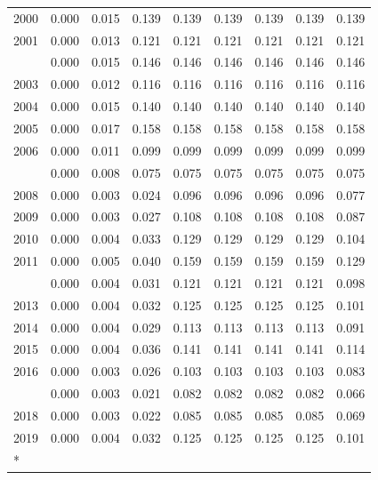 \documentclass[
]{article}
\begin{document}
\begin{longtable}[t]{lrrrrrrrr}
2000 & 0.000 & 0.015 & 0.139 & 0.139 & 0.139 & 0.139 & 0.139 & 0.139\\
2001 & 0.000 & 0.013 & 0.121 & 0.121 & 0.121 & 0.121 & 0.121 & 0.121\\
\addlinespace
2002 & 0.000 & 0.015 & 0.146 & 0.146 & 0.146 & 0.146 & 0.146 & 0.146\\
2003 & 0.000 & 0.012 & 0.116 & 0.116 & 0.116 & 0.116 & 0.116 & 0.116\\
2004 & 0.000 & 0.015 & 0.140 & 0.140 & 0.140 & 0.140 & 0.140 & 0.140\\
2005 & 0.000 & 0.017 & 0.158 & 0.158 & 0.158 & 0.158 & 0.158 & 0.158\\
2006 & 0.000 & 0.011 & 0.099 & 0.099 & 0.099 & 0.099 & 0.099 & 0.099\\
\addlinespace
2007 & 0.000 & 0.008 & 0.075 & 0.075 & 0.075 & 0.075 & 0.075 & 0.075\\
2008 & 0.000 & 0.003 & 0.024 & 0.096 & 0.096 & 0.096 & 0.096 & 0.077\\
2009 & 0.000 & 0.003 & 0.027 & 0.108 & 0.108 & 0.108 & 0.108 & 0.087\\
2010 & 0.000 & 0.004 & 0.033 & 0.129 & 0.129 & 0.129 & 0.129 & 0.104\\
2011 & 0.000 & 0.005 & 0.040 & 0.159 & 0.159 & 0.159 & 0.159 & 0.129\\
\addlinespace
2012 & 0.000 & 0.004 & 0.031 & 0.121 & 0.121 & 0.121 & 0.121 & 0.098\\
2013 & 0.000 & 0.004 & 0.032 & 0.125 & 0.125 & 0.125 & 0.125 & 0.101\\
2014 & 0.000 & 0.004 & 0.029 & 0.113 & 0.113 & 0.113 & 0.113 & 0.091\\
2015 & 0.000 & 0.004 & 0.036 & 0.141 & 0.141 & 0.141 & 0.141 & 0.114\\
2016 & 0.000 & 0.003 & 0.026 & 0.103 & 0.103 & 0.103 & 0.103 & 0.083\\
\addlinespace
2017 & 0.000 & 0.003 & 0.021 & 0.082 & 0.082 & 0.082 & 0.082 & 0.066\\
2018 & 0.000 & 0.003 & 0.022 & 0.085 & 0.085 & 0.085 & 0.085 & 0.069\\
2019 & 0.000 & 0.004 & 0.032 & 0.125 & 0.125 & 0.125 & 0.125 & 0.101\\*
\end{longtable}
\end{document}
